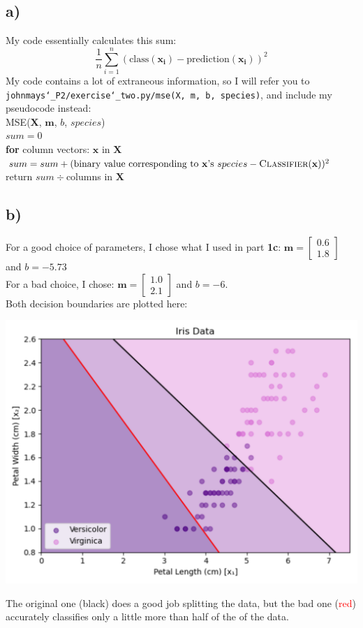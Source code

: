 \documentclass{article} %
\newcommand{\us}{\char`_}
\begin{document}
\subsection*{a)}
My code essentially calculates this sum:
\begin{equation*}
    \frac{1}{n}\sum_{i=1}^{n}(\text{class}(\mathbf{x_{i}})-\text{prediction}(\mathbf{x_{i}}))^{2}
\end{equation*}
My code contains a lot of extraneous information, so I will refer you to\\ \texttt{johnmays\us P2/exercise\char`_two.py/mse(X, m, b, species)}, and include my pseudocode instead:\\
\linebreak
\textsc{MSE}($\mathbf{X}$, $\mathbf{m}$, $b$, $species$)\\
\indent $sum = 0$\\
\indent \textbf{for} column vectors: $\mathbf{x}$ in $\mathbf{X}$\\
\indent \indent $sum = sum + (\text{binary value corresponding to }\mathbf{x}\text{'s }species  - \textsc{Classifier}(\mathbf{x}))^{2}$\\
\indent return $sum \div$columns in $\mathbf{X}$
\pagebreak
\subsection*{b)}
For a good choice of parameters, I chose what I used in part \textbf{1c}: $\mathbf{m}=\begin{bmatrix}0.6\\1.8\end{bmatrix}$ and $b=-5.73$\\
For a bad choice, I chose: $\mathbf{m}=\begin{bmatrix}1.0\\2.1\end{bmatrix}$ and $b=-6$.\\
\linebreak
Both decision boundaries are plotted here:
\begin{center}
    \includegraphics[scale = 0.4]{2b_plot_2.png}
\end{center}
The original one (black) does a good job splitting the data, but the bad one (\textcolor{red}{red}) accurately classifies only a little more than half of the of the data.\\
\end{document}
